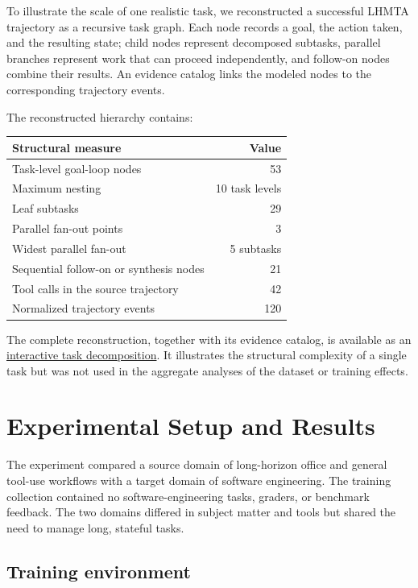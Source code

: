 \documentclass{article}
\begin{document}
To illustrate the scale of one realistic task, we reconstructed a successful LHMTA trajectory as a recursive task graph. Each node records a goal, the action taken, and the resulting state; child nodes represent decomposed subtasks, parallel branches represent work that can proceed independently, and follow-on nodes combine their results. An evidence catalog links the modeled nodes to the corresponding trajectory events.

The reconstructed hierarchy contains:

\begin{center}
\begin{tabular}{lr}
\toprule
Structural measure & Value \\
\midrule
Task-level goal-loop nodes & 53 \\
Maximum nesting & 10 task levels \\
Leaf subtasks & 29 \\
Parallel fan-out points & 3 \\
Widest parallel fan-out & 5 subtasks \\
Sequential follow-on or synthesis nodes & 21 \\
Tool calls in the source trajectory & 42 \\
Normalized trajectory events & 120 \\
\bottomrule
\end{tabular}
\end{center}

The complete reconstruction, together with its evidence catalog, is available as an \href{https://logan-surge.github.io/lhmta-task-decomposition/}{interactive task decomposition}. It illustrates the structural complexity of a single task but was not used in the aggregate analyses of the dataset or training effects.

\section{Experimental Setup and Results}
\label{sec:setup}

The experiment compared a source domain of long-horizon office and general tool-use workflows with a target domain of software engineering. The training collection contained no software-engineering tasks, graders, or benchmark feedback. The two domains differed in subject matter and tools but shared the need to manage long, stateful tasks.

\subsection{Training environment}
\label{sec:environment}
\end{document}
